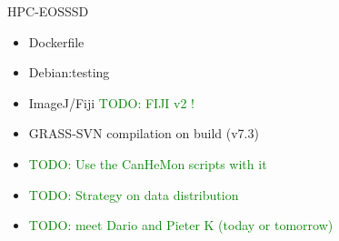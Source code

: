 \documentclass[serif,mathserif,aspectratio=169]{beamer}
\begin{document}


{
\begin{frame}[plain]
\begin{shaded}
\Huge HPC-EOSSSD
\end{shaded}
\end{frame}}


\begin{frame}
\begin{center}
\begin{itemize}
 \item Dockerfile
 \item Debian:testing
 \item ImageJ/Fiji \textcolor{green}{TODO: FIJI v2 !}
 \item GRASS-SVN compilation on build (v7.3)
 \item \textcolor{green}{TODO: Use the CanHeMon scripts with it}
 \item \textcolor{green}{TODO: Strategy on data distribution}
 \item \textcolor{green}{TODO: meet Dario and Pieter K (today or tomorrow)}
\end{itemize}
\end{center}
\end{frame}

\end{document}
